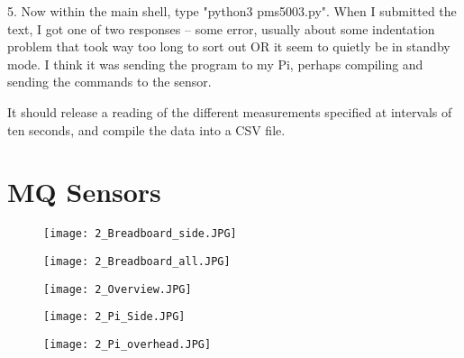 \documentclass{article}
\begin{document}
5.  Now within the main shell, type "python3 pms5003.py". When I submitted the text, I got one of two responses -- some error, usually about some indentation problem that took way too long to sort out OR it seem to quietly be in standby mode. I think it was sending the program to my Pi, perhaps compiling and sending the commands to the sensor.  

It should release a reading of the different measurements specified at intervals of ten seconds, and compile the data into a CSV file.

\section{MQ Sensors}

\begin{figure}
\texttt{[image: 2\_Breadboard\_side.JPG]}
\end{figure}

\begin{figure}
\texttt{[image: 2\_Breadboard\_all.JPG]}
\end{figure}

\begin{figure}
\texttt{[image: 2\_Overview.JPG]}
\end{figure}

\begin{figure}
\texttt{[image: 2\_Pi\_Side.JPG]}
\end{figure}

\begin{figure}
\texttt{[image: 2\_Pi\_overhead.JPG]}
\end{figure}
\end{document}
